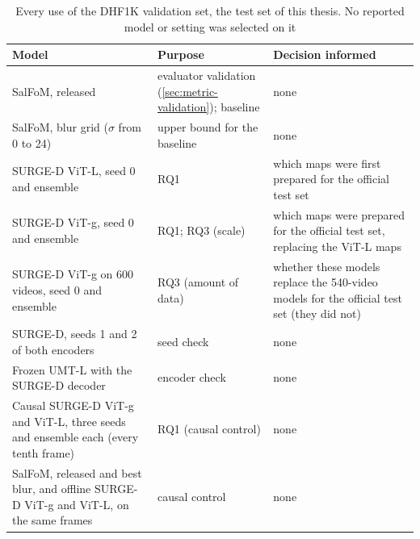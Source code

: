 \begin{table}[htbp]
  \centering
  \caption{Every use of the DHF1K validation set, the test set of this thesis.
  No reported model or setting was selected on it}\label{tab:val-ledger}
  \footnotesize
  \begin{tabularx}{\textwidth}{@{}>{\raggedright}p{4.6cm}>{\raggedright}X>{\raggedright\arraybackslash}p{4.4cm}@{}}
    \toprule
    \textbf{Model} & \textbf{Purpose} & \textbf{Decision informed} \\
    \midrule
    SalFoM, released & evaluator validation (\cref{sec:metric-validation}); baseline & none \\
    SalFoM, blur grid ($\sigma$ from 0 to 24) & upper bound for the baseline & none \\
    SURGE-D \acrshort{ViT}-L, seed 0 and ensemble & RQ1 & which maps were first prepared for the official test set \\
    SURGE-D \acrshort{ViT}-g, seed 0 and ensemble & RQ1; RQ3 (scale) & which maps were prepared for the official test set, replacing the \acrshort{ViT}-L maps \\
    SURGE-D \acrshort{ViT}-g on 600 videos, seed 0 and ensemble & RQ3 (amount of data) & whether these models replace the 540-video models for the official test set (they did not) \\
    SURGE-D, seeds 1 and 2 of both encoders & seed check & none \\
    Frozen \acrshort{UMT}-L with the SURGE-D decoder & encoder check & none \\
    Causal SURGE-D \acrshort{ViT}-g and \acrshort{ViT}-L, three seeds and ensemble each (every tenth frame) & RQ1 (causal control) & none \\
    SalFoM, released and best blur, and offline SURGE-D \acrshort{ViT}-g and \acrshort{ViT}-L, on the same frames & causal control & none \\
    \bottomrule
  \end{tabularx}
\end{table}

